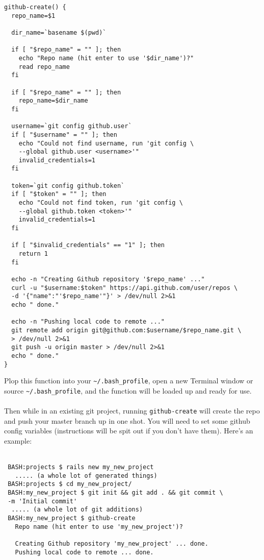 \documentclass[12pt,letterpaper,dvips]{article}
\newcommand{\cmd}[1]{\texttt{#1}}
\begin{document}
\newpage
\begin{Verbatim}
github-create() {
  repo_name=$1
 
  dir_name=`basename $(pwd)`
 
  if [ "$repo_name" = "" ]; then
    echo "Repo name (hit enter to use '$dir_name')?"
    read repo_name
  fi
 
  if [ "$repo_name" = "" ]; then
    repo_name=$dir_name
  fi
 
  username=`git config github.user`
  if [ "$username" = "" ]; then
    echo "Could not find username, run 'git config \
    --global github.user <username>'"
    invalid_credentials=1
  fi
 
  token=`git config github.token`
  if [ "$token" = "" ]; then
    echo "Could not find token, run 'git config \
    --global github.token <token>'"
    invalid_credentials=1
  fi
 
  if [ "$invalid_credentials" == "1" ]; then
    return 1
  fi
 
  echo -n "Creating Github repository '$repo_name' ..."
  curl -u "$username:$token" https://api.github.com/user/repos \
  -d '{"name":"'$repo_name'"}' > /dev/null 2>&1
  echo " done."
 
  echo -n "Pushing local code to remote ..."
  git remote add origin git@github.com:$username/$repo_name.git \
  > /dev/null 2>&1
  git push -u origin master > /dev/null 2>&1
  echo " done."
}
\end{Verbatim}

\noindent Plop this function into your \cmd{\textasciitilde/.bash\_profile}, open a new
Terminal window or source \cmd{\textasciitilde/.bash\_profile}, and the function
will be loaded up and ready for use.
\\
\\
Then while in an existing git project, running \cmd{github-create}
will create the repo and push your master branch up in one shot.
You will need to set some github config variables (instructions
will be spit out if you don't have them).  Here’s an example:
\\
\\
\begin{Verbatim}
 BASH:projects $ rails new my_new_project
   ..... (a whole lot of generated things)
 BASH:projects $ cd my_new_project/
 BASH:my_new_project $ git init && git add . && git commit \
 -m 'Initial commit'
  ..... (a whole lot of git additions)
 BASH:my_new_project $ github-create
   Repo name (hit enter to use 'my_new_project')?
 
   Creating Github repository 'my_new_project' ... done.
   Pushing local code to remote ... done.
\end{Verbatim}
\end{document}
